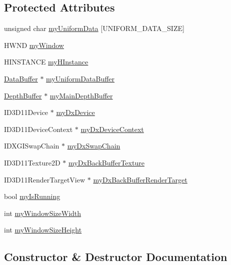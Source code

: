 \subsection*{Protected Attributes}
\begin{DoxyCompactItemize}
\item 
unsigned char \hyperlink{class_direct_x_manager_ae04e85d0a8cc262e45d7af9024fe2051}{my\+Uniform\+Data} \mbox{[}U\+N\+I\+F\+O\+R\+M\+\_\+\+D\+A\+T\+A\+\_\+\+S\+I\+ZE\mbox{]}
\item 
H\+W\+ND \hyperlink{class_direct_x_manager_aaa12b1687acb8f70bd1ac7245be80c07}{my\+Window}
\item 
H\+I\+N\+S\+T\+A\+N\+CE \hyperlink{class_direct_x_manager_a0b39e8b76d45f918d5b43da5dbfba83f}{my\+H\+Instance}
\item 
\hyperlink{class_data_buffer}{Data\+Buffer} $\ast$ \hyperlink{class_direct_x_manager_a739e4f51ccf5cfff52387b4026c57e1d}{my\+Uniform\+Data\+Buffer}
\item 
\hyperlink{class_depth_buffer}{Depth\+Buffer} $\ast$ \hyperlink{class_direct_x_manager_a3626b7fb2456f6334b3442a16e4ec6f9}{my\+Main\+Depth\+Buffer}
\item 
I\+D3\+D11\+Device $\ast$ \hyperlink{class_direct_x_manager_ad413d8beeaacd31be6a5520afe1b8a50}{my\+Dx\+Device}
\item 
I\+D3\+D11\+Device\+Context $\ast$ \hyperlink{class_direct_x_manager_a54d0f3f23f8481ecd38c9593ef5637b9}{my\+Dx\+Device\+Context}
\item 
I\+D\+X\+G\+I\+Swap\+Chain $\ast$ \hyperlink{class_direct_x_manager_a2812dd8db44c309cd3b03748112482e3}{my\+Dx\+Swap\+Chain}
\item 
I\+D3\+D11\+Texture2D $\ast$ \hyperlink{class_direct_x_manager_ab0ee9dcf63fe7b20478e0e15632f8d5e}{my\+Dx\+Back\+Buffer\+Texture}
\item 
I\+D3\+D11\+Render\+Target\+View $\ast$ \hyperlink{class_direct_x_manager_a6a94536e4b95c5847224dc94cd9f5f79}{my\+Dx\+Back\+Buffer\+Render\+Target}
\item 
bool \hyperlink{class_direct_x_manager_ab6d80d209ac41961b6913b109ca9a8fe}{my\+Is\+Running}
\item 
int \hyperlink{class_direct_x_manager_adc2c37647b0833a08f116c4873f8ab3f}{my\+Window\+Size\+Width}
\item 
int \hyperlink{class_direct_x_manager_a489f71bd3dcfdaa3e9f6d6c37daee516}{my\+Window\+Size\+Height}
\end{DoxyCompactItemize}


\subsection{Constructor \& Destructor Documentation}
